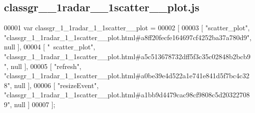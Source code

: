 \subsection{classgr\+\_\+\_\+1radar\+\_\+\_\+1scatter\+\_\+\+\_\+plot.\+js}
\label{classgr__1__1radar__1__1scatter____plot_8js_source}

\begin{DoxyCode}
00001 var classgr_1_1radar_1_1scatter__plot =
00002 [
00003     [ \textcolor{stringliteral}{"scatter\_plot"}, \textcolor{stringliteral}{"classgr\_1\_1radar\_1\_1scatter\_\_plot.html#a8ff20fecfe164697cf4252ba37a780d9"}, null ],
00004     [ \textcolor{stringliteral}{"~scatter\_plot"}, \textcolor{stringliteral}{"classgr\_1\_1radar\_1\_1scatter\_\_plot.html#a5c513678732dff5f3c35c02848b2bcb9"}, null ],
00005     [ \textcolor{stringliteral}{"refresh"}, \textcolor{stringliteral}{"classgr\_1\_1radar\_1\_1scatter\_\_plot.html#a0be39e4d522a1e741e841d5f7bc4c328"}, null ],
00006     [ \textcolor{stringliteral}{"resizeEvent"}, \textcolor{stringliteral}{"classgr\_1\_1radar\_1\_1scatter\_\_plot.html#a1bb9d4479cac98cf9808c5d203227089"}, null ]
00007 ];
\end{DoxyCode}
